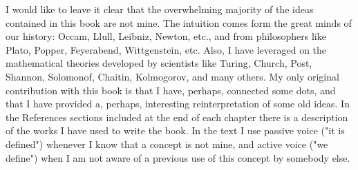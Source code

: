 I would like to leave it clear that the overwhelming majority of the ideas contained in this book are not mine. The intuition comes form the great minds of our history: Occam, Llull, Leibniz, Newton, etc., and from philosophers like Plato, Popper, Feyerabend, Wittgenstein, etc. Also, I have leveraged on the mathematical theories developed by scientists like Turing, Church, Post, Shannon, Solomonof, Chaitin, Kolmogorov, and many others. My only original contribution with this book is that I have, perhaps, connected some dots, and that I have provided a, perhaps, interesting reinterpretation of some old ideas. In the References sections included at the end of each chapter there is a description of the works I have used to write the book. In the text I use passive voice ("it is defined") whenever I know that a concept is not mine, and active voice ("we define") when I am not aware of a previous use of this concept by somebody else.

